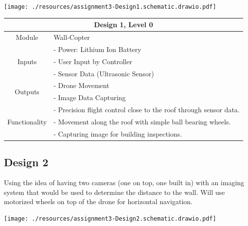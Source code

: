 \documentclass[12pt]{article}
\begin{document}
            \vspace{0.5in}
            \centerline{\texttt{[image: ./resources/assignment3-Design1.schematic.drawio.pdf]}}

            \vspace{0.5in}
            \begin{tabular}{|c|l|}
                \hline
                \multicolumn{2}{|c|}{\textbf{Design 1, Level 0}} \\\hline
                Module & Wall-Copter \\\hline
                \multirow{3}{3cm}{Inputs}
                    & - Power: Lithium Ion Battery\\
                    & - User Input by Controller \\
                    & - Sensor Data (Ultrasonic Sensor) \\
                    \hline
                \multirow{2}{3cm}{Outputs}
                    & - Drone Movement \\
                    & - Image Data Capturing \\
                    \hline
                \multirow{3}{3cm}{Functionality}
                    & - Precision flight control close to the roof through sensor data. \\
                    & - Movement along the roof with simple ball bearing wheels. \\
                    & - Capturing image for building inspections. \\
                    \hline
                
            \end{tabular}
            
        \newpage
        \subsection{Design 2}
            Using the idea of having two cameras (one on top, one built in) with an imaging system that would be used to determine the distance to the wall.
            Will use motorized wheels on top of the drone for horizontal navigation.
            
            \vspace{0.5in}
            \centerline{\texttt{[image: ./resources/assignment3-Design2.schematic.drawio.pdf]}}
\end{document}
